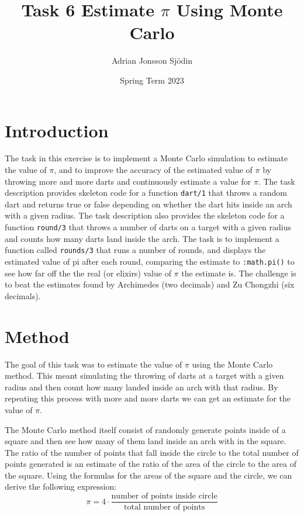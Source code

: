 \documentclass[a4paper,11pt]{article}
\begin{document}
\title{
    \textbf{Task 6 Estimate $\pi$ Using Monte Carlo}
}
\author{Adrian Jonsson Sjödin}
\date{Spring Term 2023}

\maketitle

\section*{Introduction}
The task in this exercise is to implement a Monte Carlo simulation to estimate the value of $\pi$, and to improve the accuracy of
the estimated value of $\pi$ by throwing more and more darts and continuously estimate a value for $\pi$. The task description 
provides skeleton code for a function {\tt dart/1} that throws a random dart and returns true or false depending on whether the 
dart hits inside an arch with a given radius. The task description also provides the skeleton code for a function {\tt round/3} 
that throws a number of darts on a target with a given radius and counts how many darts land inside the arch. The task is to 
implement a function called {\tt rounds/3} that runs a number of rounds, and displays the estimated value of pi after each round, 
comparing the estimate to {\tt :math.pi()} to see how far off the the real (or elixirs) value of $\pi$ the estimate is. 
The challenge is to beat the estimates found by Archimedes (two decimals) and Zu Chongzhi (six decimals).
\section*{Method}
The goal of this task was to estimate the value of $\pi$ using the Monte Carlo method. This meant simulating the throwing of darts
at a target with a given radius and then count how many landed inside an arch with that radius. By repeating this process with more 
and more darts we can get an estimate for the value of $\pi$. 

The Monte Carlo method itself consist of randomly generate points inside of a square and then see how many of them land inside 
an arch with in the square. The ratio of the number of points that fall inside the circle to the total number of points generated
is an estimate of the ratio of the area of the circle to the area of the square. Using the formulas for the areas of the square 
and the circle, we can derive the following expression:
\[ \pi =4 \cdot \frac{\text{number of points inside circle}}{\text{total number of points}}\]
\end{document}
